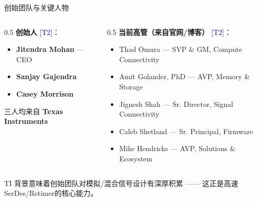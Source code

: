 \documentclass[UTF8,11pt,aspectratio=169]{beamer}
\newcommand{\sourceT}[1]{{\small\textcolor{darkblue}{[T#1]}}}
\begin{document}
\begin{frame}{创始团队与关键人物}
    \begin{columns}[T]
        \begin{column}{0.5\textwidth}
            \textbf{创始人} \sourceT{2}：
            \begin{itemize}
                \item \textbf{Jitendra Mohan} — CEO
                \item \textbf{Sanjay Gajendra}
                \item \textbf{Casey Morrison}
            \end{itemize}
            \vspace{0.3cm}
            三人均来自 \textbf{Texas Instruments}
        \end{column}
        \begin{column}{0.5\textwidth}
            \textbf{当前高管（来自官网/博客）} \sourceT{2}：
            \begin{itemize}
                \item Thad Omura — SVP \& GM, Compute Connectivity
                \item Amit Golander, PhD — AVP, Memory \& Storage
                \item Jignesh Shah — Sr. Director, Signal Connectivity
                \item Caleb Shetland — Sr. Principal, Firmware
                \item Mike Hendricks — AVP, Solutions \& Ecosystem
            \end{itemize}
        \end{column}
    \end{columns}

    \vspace{0.3cm}
    \begin{keypoint}
        TI 背景意味着创始团队对模拟/混合信号设计有深厚积累 —— 这正是高速SerDes/Retimer的核心能力。
    \end{keypoint}
\end{frame}

\end{document}
